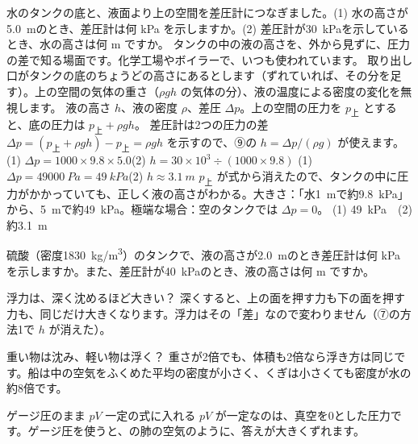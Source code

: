 \begin{phreidai}[差圧式の液面計]
\label{ph:力-12:ex16}水のタンクの底と、液面より上の空間を差圧計につなぎました。(1) 水の高さが\qty{5.0}{m}のとき、差圧計は何 kPa を示しますか。(2) 差圧計が\qty{30}{kPa}を示しているとき、水の高さは何 m ですか。
\phbamen
タンクの中の液の高さを、外から見ずに、圧力の差で知る場面です。化学工場やボイラーで、いつも使われています。
\phmushi
取り出し口がタンクの底のちょうどの高さにあるとします（ずれていれば、その分を足す）。上の空間の気体の重さ（$\rho gh$ の気体の分）、液の温度による密度の変化を無視します。
\phzu
液の高さ $h$、液の密度 $\rho$、差圧 $\Delta p$。上の空間の圧力を $p_{\text{上}}$ とすると、底の圧力は $p_{\text{上}}+\rho gh$。
\phriyu
差圧計は2つの圧力の差 $\Delta p=(p_{\text{上}}+\rho gh)-p_{\text{上}}=\rho gh$ を示すので、⑨の $h=\Delta p/(\rho g)$ が使えます。
\phtateru
(1) $\Delta p=1000\times9.8\times5.0$\qquad (2) $h=30\times10^3\div (1000\times9.8)$
\phtoku
(1) $\Delta p=\qty{49000}{Pa}=\qty{49}{kPa}$\qquad (2) $h\approx\qty{3.1}{m}$
\phtashikame
$p_{\text{上}}$ が式から消えたので、タンクの中に圧力がかかっていても、正しく液の高さがわかる。大きさ：「水\qty{1}{m}で約\qty{9.8}{kPa}」から、\qty{5}{m}で約\qty{49}{kPa}。極端な場合：空のタンクでは $\Delta p=0$。
\kotae (1) \qty{49}{kPa}　(2) 約\qty{3.1}{m}
\end{phreidai}
\begin{jibun}
硫酸（密度\qty{1830}{kg/m^3}）のタンクで、液の高さが\qty{2.0}{m}のとき差圧計は何 kPa を示しますか。また、差圧計が\qty{40}{kPa}のとき、液の高さは何 m ですか。
\end{jibun}

\begin{tsumazuki}{浮力は、深く沈めるほど大きい？}
深くすると、上の面を押す力も下の面を押す力も、同じだけ大きくなります。浮力はその「差」なので変わりません（⑦の方法1で $h$ が消えた）。
\end{tsumazuki}
\begin{tsumazuki}{重い物は沈み、軽い物は浮く？}
重さが2倍でも、体積も2倍なら浮き方は同じです。船は中の空気をふくめた平均の密度が小さく、くぎは小さくても密度が水の約8倍です。
\end{tsumazuki}
\begin{tsumazuki}{ゲージ圧のまま $pV$ 一定の式に入れる}
$pV$ が一定なのは、真空を0とした圧力です。ゲージ圧を使うと、の肺の空気のように、答えが大きくずれます。
\end{tsumazuki}

